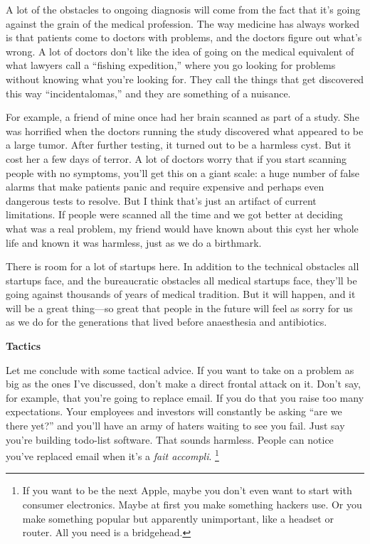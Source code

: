 A lot of the obstacles to ongoing diagnosis will come from the fact that
it's going against the grain of the medical profession. The way medicine
has always worked is that patients come to doctors with problems, and
the doctors figure out what's wrong. A lot of doctors don't like the
idea of going on the medical equivalent of what lawyers call a ``fishing
expedition,'' where you go looking for problems without knowing what
you're looking for. They call the things that get discovered this way
``incidentalomas,'' and they are something of a nuisance.

For example, a friend of mine once had her brain scanned as part of a
study. She was horrified when the doctors running the study discovered
what appeared to be a large tumor. After further testing, it turned out
to be a harmless cyst. But it cost her a few days of terror. A lot of
doctors worry that if you start scanning people with no symptoms, you'll
get this on a giant scale: a huge number of false alarms that make
patients panic and require expensive and perhaps even dangerous tests to
resolve. But I think that's just an artifact of current limitations. If
people were scanned all the time and we got better at deciding what was
a real problem, my friend would have known about this cyst her whole
life and known it was harmless, just as we do a birthmark.

There is room for a lot of startups here. In addition to the technical
obstacles all startups face, and the bureaucratic obstacles all medical
startups face, they'll be going against thousands of years of medical
tradition. But it will happen, and it will be a great thing---so great
that people in the future will feel as sorry for us as we do for the
generations that lived before anaesthesia and antibiotics.

\textbf{Tactics}

Let me conclude with some tactical advice. If you want to take on a
problem as big as the ones I've discussed, don't make a direct frontal
attack on it. Don't say, for example, that you're going to replace
email. If you do that you raise too many expectations. Your employees
and investors will constantly be asking ``are we there yet?'' and you'll
have an army of haters waiting to see you fail. Just say you're building
todo-list software. That sounds harmless. People can notice you've
replaced email when it's a \emph{fait accompli}. \footnote{If you want to be the next Apple, maybe you don't even want to
start with consumer electronics. Maybe at first you make something
hackers use. Or you make something popular but apparently unimportant,
like a headset or router. All you need is a bridgehead.}

